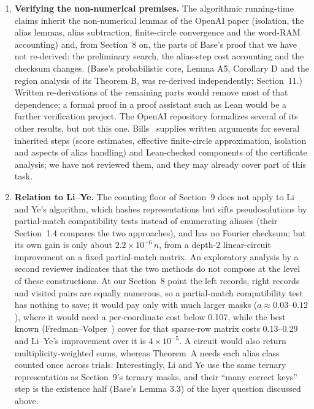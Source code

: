 \documentclass[11pt]{article}
\newcommand{\E}{\mathbb{E}}
\theoremstyle{plain}
\begin{document}
\begin{enumerate}
For amplitude tilting, define, for fixed densities and multiplier $p$, and for $c$ near 1,
\[
\psi(c)=\log_2\int_{\mathbb T}2^{c\lambda(x)+p(\Delta-u(x))}\,dx,
\qquad \lambda(x)=\log_2(2+2\cos x).
\]
Thus $\psi(1)=\log_2 M_1$ and $\psi'(1)=\E_{\nu_1}\lambda$, where $\nu_1$ is the normalized integrand at $c=1$. Also $\partial_p\log_2 M_1=\Delta-\E_{\nu_1}u$. At an interior minimum with respect to $p$, the latter derivative vanishes. This identity alone does not prove a global minimax statement or identify the two moments' maximizing types. In the tested joint optimizations of densities, amplitude tilts, cutoffs and affine certificates, the amplitude coefficient returned to 1. Separate sampling-budget and threshold variations also gave no improvement in the tested model. A rigorous obstruction for these richer estimator families remains open.
\item \textbf{Verifying the non-numerical premises.} The algorithmic running-time claims inherit the non-numerical lemmas of the OpenAI paper (isolation, the alias lemmas, alias subtraction, finite-circle convergence and the word-RAM accounting) and, from Section~8 on, the parts of Base's proof that we have not re-derived: the preliminary search, the alias-step cost accounting and the checksum changes. (Base's probabilistic core, Lemma A5, Corollary D and the region analysis of its Theorem B, was re-derived independently; Section~11.) Written re-derivations of the remaining parts would remove most of that dependence; a formal proof in a proof assistant such as Lean would be a further verification project. The OpenAI repository formalizes several of its other results, but not this one. Bills~\cite{bills} supplies written arguments for several inherited steps (score estimates, effective finite-circle approximation, isolation and aspects of alias handling) and Lean-checked components of the certificate analysis; we have not reviewed them, and they may already cover part of this task.
\item \textbf{Relation to Li--Ye.} The counting floor of Section~9 does not apply to Li and Ye's algorithm, which hashes representations but sifts pseudosolutions by partial-match compatibility tests instead of enumerating aliases (their Section~1.4 compares the two approaches), and has no Fourier checksum; but its own gain is only about $2.2\times10^{-6}\, n$, from a depth-2 linear-circuit improvement on a fixed partial-match matrix. An exploratory analysis by a second reviewer indicates that the two methods do not compose at the level of these constructions. At our Section~8 point the left records, right records and visited pairs are equally numerous, so a partial-match compatibility test has nothing to save; it would pay only with much larger masks ($a \approx 0.03$--$0.12$), where it would need a per-coordinate cost below 0.107, while the best known (Fredman--Volper~\cite{fv}) cover for that sparse-row matrix costs 0.13--0.29 and Li--Ye's improvement over it is $4\times10^{-5}$. A circuit would also return multiplicity-weighted sums, whereas Theorem~A needs each alias class counted once across trials. Interestingly, Li and Ye use the same ternary representation as Section~9's ternary masks, and their ``many correct keys'' step is the existence half (Base's Lemma 3.3) of the layer question discussed above.

\end{enumerate}
\end{document}
